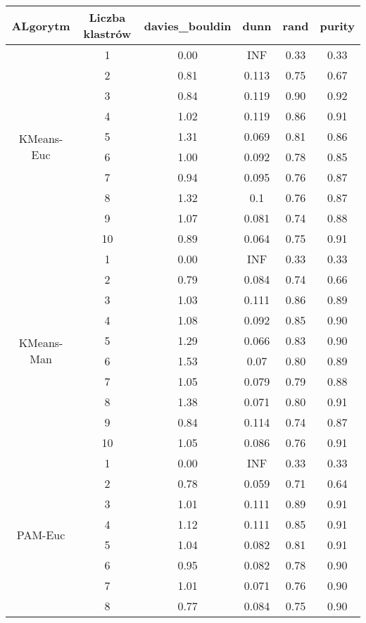 \begin{table}[H]
\centering
\begin{tabular}{cc|cccc}
  \hline
ALgorytm & Liczba klastrów & davies\_bouldin & dunn & rand & purity \\ 
  \hline
  \multirow{10}{*}{KMeans-Euc} & 1 & 0.00 & INF & 0.33 & 0.33 \\ 
  & 2 & 0.81 & 0.113 & 0.75 & 0.67 \\ 
  & 3 & 0.84 & 0.119 & 0.90 & 0.92 \\ 
  & 4 & 1.02 & 0.119 & 0.86 & 0.91 \\ 
  & 5 & 1.31 & 0.069 & 0.81 & 0.86 \\ 
  & 6 & 1.00 & 0.092 & 0.78 & 0.85 \\ 
  & 7 & 0.94 & 0.095 & 0.76 & 0.87 \\ 
  & 8 & 1.32 & 0.1 & 0.76 & 0.87 \\ 
  & 9 & 1.07 & 0.081 & 0.74 & 0.88 \\ 
  & 10 & 0.89 & 0.064 & 0.75 & 0.91 \\ \hline \hline 
  \multirow{10}{*}{KMeans-Man} & 1 & 0.00 & INF & 0.33 & 0.33 \\ 
  & 2 & 0.79 & 0.084 & 0.74 & 0.66 \\ 
  & 3 & 1.03 & 0.111 & 0.86 & 0.89 \\ 
  & 4 & 1.08 & 0.092 & 0.85 & 0.90 \\ 
  & 5 & 1.29 & 0.066 & 0.83 & 0.90 \\ 
  & 6 & 1.53 & 0.07 & 0.80 & 0.89 \\ 
  & 7 & 1.05 & 0.079 & 0.79 & 0.88 \\ 
  & 8 & 1.38 & 0.071 & 0.80 & 0.91 \\ 
  & 9 & 0.84 & 0.114 & 0.74 & 0.87 \\ 
  & 10 & 1.05 & 0.086 & 0.76 & 0.91 \\ \hline \hline 
  \multirow{10}{*}{PAM-Euc} & 1 & 0.00 & INF & 0.33 & 0.33 \\ 
  & 2 & 0.78 & 0.059 & 0.71 & 0.64 \\ 
  & 3 & 1.01 & 0.111 & 0.89 & 0.91 \\ 
  & 4 & 1.12 & 0.111 & 0.85 & 0.91 \\ 
  & 5 & 1.04 & 0.082 & 0.81 & 0.91 \\ 
  & 6 & 0.95 & 0.082 & 0.78 & 0.90 \\ 
  & 7 & 1.01 & 0.071 & 0.76 & 0.90 \\ 
  & 8 & 0.77 & 0.084 & 0.75 & 0.90 \\ 

\end{tabular}
\end{table}
